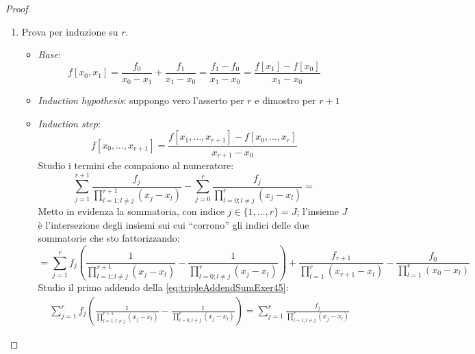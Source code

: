 \begin{proof}
\begin{enumerate}
  \item Prova per induzione su $r$.
  \begin{itemize}
    \item \emph{Base}:
    \begin{displaymath}
    	f[x_{0}, x_{1}] = \frac{f_{0}}{x_{0} - x_{1}} + \frac{f_{1}}{x_{1} - x_{0}}
    	= \frac{f_{1} - f_{0}}{x_{1} - x_{0}} = \frac{f[x_{1}] - f[x_{0}]}{x_{1} -
    	x_{0}}
    \end{displaymath}
  
  \item \emph{Induction hypothesis}: suppongo vero l'asserto per $r$ e dimostro
  per $r+1$
  \item \emph{Induction step}:
  	\begin{equation}
  	\label{eq:inductionStepExer45}
    	f[x_{0},\ldots, x_{r+1}] = 
    	\frac{ f[x_{1},\ldots, x_{r+1}] - f[x_{0},\ldots, x_{r}]}{x_{r+1} - x_{0}}
    \end{equation}
    Studio i termini che compaiono al numeratore:
    \begin{displaymath}
    	\sum_{j = 1}^{r+1}{
  		\frac{f_{j}}{\prod_{l = 1;l \not = j}^{r+1}{(x_{j} - x_{l})}}} - 
  		\sum_{j = 0}^{r}{
  		\frac{f_{j}}{\prod_{l = 0;l \not = j}^{r}{(x_{j} - x_{l})}}} = 
  	\end{displaymath}
  	Metto in evidenza la sommatoria, con indice $j \in \{1,\ldots,r\} = J$;
  	l'insieme $J$ \`e l'intersezione degli insiemi sui cui ``corrono'' gli indici
  	delle due sommatorie che sto fattorizzando:
  	\begin{equation}
  	\label{eq:tripleAddendSumExer45}
     	= \sum_{j = 1}^{r}{
  		f_{j} \left ( \frac{1}{\prod_{l = 1;l \not = j}^{r+1}{(x_{j} - x_{l})}} -
  		\frac{1}{\prod_{l = 0;l \not = j}^{r}{(x_{j} - x_{l})}}
  		\right)} + 
  		\frac{f_{r+1}}{\prod_{l = 1}^{r}{(x_{r+1} - x_{l})}} -
  		\frac{f_{0}}{\prod_{l = 1}^{r}{(x_{0} - x_{l})}}
  	\end{equation}
  	Studio il primo addendo della \ref{eq:tripleAddendSumExer45}:
  	\begin{displaymath}
  	\begin{split}
     	& \sum_{j = 1}^{r}{
  		f_{j} \left ( \frac{1}{\prod_{l = 1;l \not = j}^{r+1}{(x_{j} - x_{l})}} -
  		\frac{1}{\prod_{l = 0;l \not = j}^{r}{(x_{j} - x_{l})}}
  		\right)} = 
  		\sum_{j = 1}^{r}{
  		\frac{f_{j}}{\prod_{l = 1;l \not = j}^{r}{(x_{j} - x_{l})}} 
}
\end{split}
\end{displaymath}
\end{itemize}
\end{enumerate}
\end{proof}
